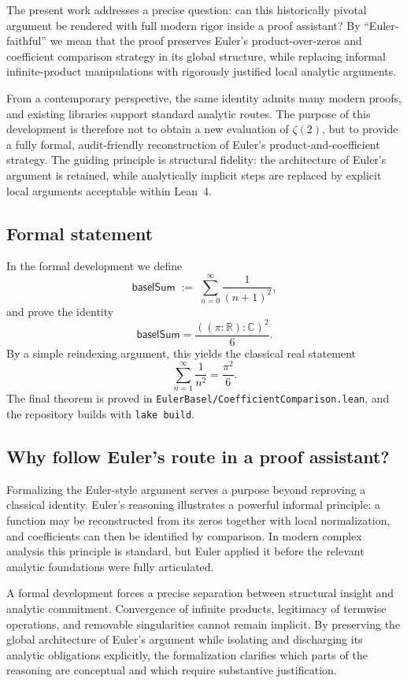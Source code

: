 \documentclass[11pt,a4paper]{article}
\theoremstyle{plain}
\theoremstyle{definition}
\DeclareRobustCommand{\codepath}[1]{\nolinkurl{#1}}
\DeclareRobustCommand{\codepath}[1]{\nolinkurl{#1}}
\newcommand{\baselSum}{\ensuremath{\mathsf{baselSum}}}
\begin{document}
The present work addresses a precise question: can this historically pivotal argument be rendered with full modern rigor inside a proof assistant? By ``Euler-faithful'' we mean that the proof preserves Euler’s product-over-zeros and coefficient comparison strategy in its global structure, while replacing informal infinite-product manipulations with rigorously justified local analytic arguments.

From a contemporary perspective, the same identity admits many modern proofs, and existing libraries support standard analytic routes. The purpose of this development is therefore not to obtain a new evaluation of \(\zeta(2)\), but to provide a fully formal, audit-friendly reconstruction of Euler’s product-and-coefficient strategy. The guiding principle is structural fidelity: the architecture of Euler’s argument is retained, while analytically implicit steps are replaced by explicit local arguments acceptable within Lean~4.

\subsection{Formal statement}

In the formal development we define
\[
\baselSum \;:=\; \sum_{n=0}^{\infty} \frac{1}{(n+1)^{2}},
\]
and prove the identity
\[
\baselSum = \frac{((\pi : \mathbb{R}) : \mathbb{C})^{2}}{6}.
\]
By a simple reindexing argument, this yields the classical real statement
\[
\sum_{n=1}^{\infty} \frac{1}{n^{2}} = \frac{\pi^{2}}{6}.
\]
The final theorem is proved in \codepath{EulerBasel/CoefficientComparison.lean}, and the repository builds with \texttt{lake build}.

\subsection{Why follow Euler's route in a proof assistant?}

Formalizing the Euler-style argument serves a purpose beyond reproving a classical identity. Euler’s reasoning illustrates a powerful informal principle: a function may be reconstructed from its zeros together with local normalization, and coefficients can then be identified by comparison. In modern complex analysis this principle is standard, but Euler applied it before the relevant analytic foundations were fully articulated.

A formal development forces a precise separation between structural insight and analytic commitment. Convergence of infinite products, legitimacy of termwise operations, and removable singularities cannot remain implicit. By preserving the global architecture of Euler’s argument while isolating and discharging its analytic obligations explicitly, the formalization clarifies which parts of the reasoning are conceptual and which require substantive justification.
\end{document}
